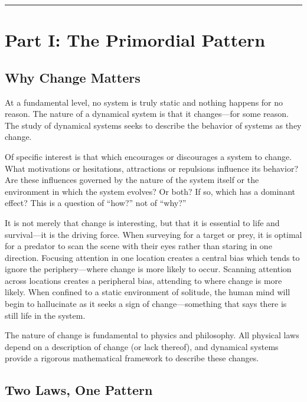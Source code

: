 \documentclass[
]{article}
\begin{document}
\begin{center}\rule{0.5\linewidth}{0.5pt}\end{center}

\section{Part I: The Primordial
Pattern}\label{part-i-the-primordial-pattern}

\subsection{Why Change Matters}\label{why-change-matters}

At a fundamental level, no system is truly static and nothing happens
for no reason. The nature of a dynamical system is that it changes---for
some reason. The study of dynamical systems seeks to describe the
behavior of systems as they change.

Of specific interest is that which encourages or discourages a system to
change. What motivations or hesitations, attractions or repulsions
influence its behavior? Are these influences governed by the nature of
the system itself or the environment in which the system evolves? Or
both? If so, which has a dominant effect? This is a question of ``how?''
not of ``why?''

It is not merely that change is interesting, but that it is essential to
life and survival---it is the driving force. When surveying for a target
or prey, it is optimal for a predator to scan the scene with their eyes
rather than staring in one direction. Focusing attention in one location
creates a central bias which tends to ignore the periphery---where
change is more likely to occur. Scanning attention across locations
creates a peripheral bias, attending to where change is more likely.
When confined to a static environment of solitude, the human mind will
begin to hallucinate as it seeks a sign of change---something that says
there is still life in the system.

The nature of change is fundamental to physics and philosophy. All
physical laws depend on a description of change (or lack thereof), and
dynamical systems provide a rigorous mathematical framework to describe
these changes.

\subsection{Two Laws, One Pattern}\label{two-laws-one-pattern}
\end{document}
